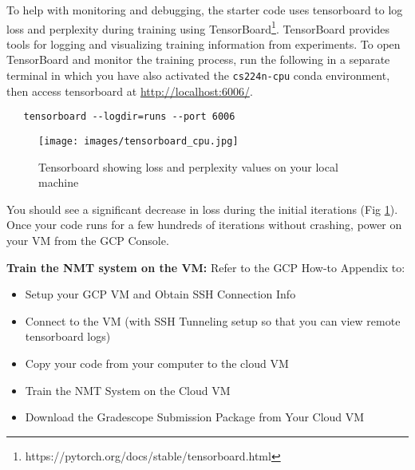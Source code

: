 To help with monitoring and debugging, the starter code uses tensorboard to log loss and perplexity during training using TensorBoard\footnote{https://pytorch.org/docs/stable/tensorboard.html}. TensorBoard provides tools for logging and visualizing training information from experiments. To open TensorBoard and monitor the training process, run the following in a separate terminal in which you have also activated the \texttt{cs224n-cpu} conda environment, then access tensorboard at \href{http://localhost:6006/}{http://localhost:6006/}.

\begin{lstlisting}
   tensorboard --logdir=runs --port 6006
\end{lstlisting}


\begin{figure}[h]
    \centering
    \texttt{[image: images/tensorboard\_cpu.jpg]}
    \caption{Tensorboard showing loss and perplexity values on your local machine}
    \label{fig:tensorboard-cpu}
\end{figure}

You should see a significant decrease in loss during the initial iterations (Fig \ref{fig:tensorboard-cpu}). Once your code runs for a few hundreds of iterations without crashing, power on your VM from the GCP Console. 

\textbf{Train the NMT system on the VM:} Refer to the GCP How-to Appendix to:
\begin{itemize}
    \item Setup your GCP VM and Obtain SSH Connection Info
    \item Connect to the VM (with SSH Tunneling setup so that you can view remote tensorboard logs)
    \item Copy your code from your computer to the cloud VM
    \item Train the NMT System on the Cloud VM
    \item Download the Gradescope Submission Package from Your Cloud VM
\end{itemize}






